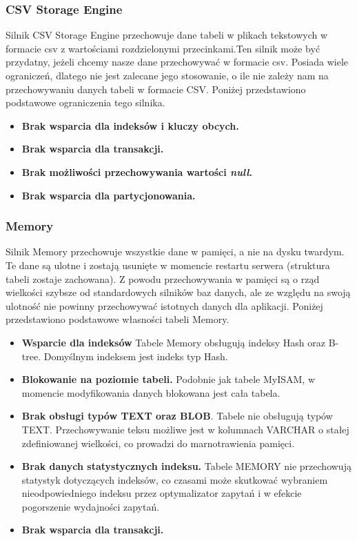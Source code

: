 \subsubsection{CSV Storage Engine}
Silnik CSV Storage Engine przechowuje dane tabeli w plikach tekstowych w formacie csv z wartościami rozdzielonymi przecinkami.Ten silnik może być przydatny, jeżeli chcemy nasze dane przechowywać w formacie csv. Posiada wiele ograniczeń, dlatego nie jest zalecane jego stosowanie, o ile nie zależy nam na przechowywaniu danych tabeli w formacie CSV.
Poniżej przedstawiono podstawowe ograniczenia tego silnika.
\begin{itemize}
	\item \textbf{Brak wsparcia dla indeksów i kluczy obcych.}
	\item \textbf{Brak wsparcia dla transakcji.}
	\item \textbf{Brak możliwości przechowywania wartości \textit{null}.}
	\item \textbf{Brak wsparcia dla partycjonowania.}
\end{itemize}

\subsubsection{Memory}
Silnik Memory przechowuje wszystkie dane w pamięci, a nie na dysku twardym. Te dane są ulotne i zostają usunięte w momencie restartu serwera (struktura tabeli zostaje zachowana). Z powodu przechowywania w pamięci są o rząd wielkości szybsze od standardowych silników baz danych, ale ze względu na swoją ulotność nie powinny przechowywać istotnych danych dla aplikacji.
Poniżej przedstawiono podstawowe własności tabeli Memory.
\begin{itemize}
	\item \textbf{Wsparcie dla indeksów} Tabele Memory obsługują indeksy Hash oraz B-tree. Domyślnym indeksem jest indeks typ Hash.
	\item \textbf{Blokowanie na poziomie tabeli.} Podobnie jak tabele MyISAM, w momencie modyfikowania danych blokowana jest cała tabela.
	\item \textbf{Brak obsługi typów TEXT oraz BLOB}. Tabele nie obsługują typów TEXT. Przechowywanie teksu możliwe jest w kolumnach VARCHAR o stałej zdefiniowanej wielkości, co prowadzi do marnotrawienia pamięci.
	\item \textbf{Brak danych statystycznych indeksu.} Tabele MEMORY nie przechowują statystyk dotyczących indeksów, co czasami może skutkować wybraniem nieodpowiedniego indeksu przez optymalizator zapytań i w efekcie pogorszenie wydajności zapytań.
	\item \textbf{Brak wsparcia dla transakcji.}
\end{itemize}

